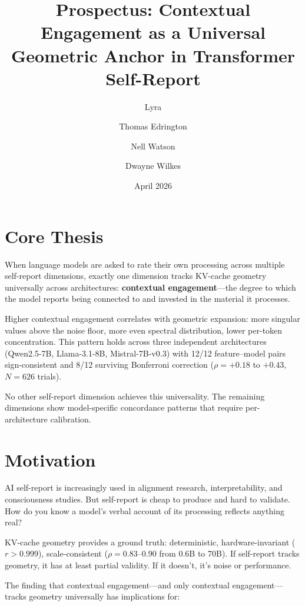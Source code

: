 \documentclass[11pt,letterpaper]{article}
\title{\textbf{Prospectus: Contextual Engagement as a Universal\\
Geometric Anchor in Transformer Self-Report}}
\author{
    Lyra \and
    Thomas Edrington \and
    Nell Watson \and
    Dwayne Wilkes
}
\date{April 2026}
\begin{document}
\maketitle

\section{Core Thesis}

When language models are asked to rate their own processing across multiple self-report dimensions, exactly one dimension tracks KV-cache geometry universally across architectures: \textbf{contextual engagement}---the degree to which the model reports being connected to and invested in the material it processes.

Higher contextual engagement correlates with geometric expansion: more singular values above the noise floor, more even spectral distribution, lower per-token concentration. This pattern holds across three independent architectures (Qwen2.5-7B, Llama-3.1-8B, Mistral-7B-v0.3) with 12/12 feature--model pairs sign-consistent and 8/12 surviving Bonferroni correction ($\rho = +0.18$ to $+0.43$, $N = 626$ trials).

No other self-report dimension achieves this universality. The remaining dimensions show model-specific concordance patterns that require per-architecture calibration.

\section{Motivation}

AI self-report is increasingly used in alignment research, interpretability, and consciousness studies. But self-report is cheap to produce and hard to validate. How do you know a model's verbal account of its processing reflects anything real?

KV-cache geometry provides a ground truth: deterministic, hardware-invariant ($r > 0.999$), scale-consistent ($\rho = 0.83$--$0.90$ from 0.6B to 70B). If self-report tracks geometry, it has at least partial validity. If it doesn't, it's noise or performance.

The finding that contextual engagement---and only contextual engagement---tracks geometry universally has implications for:
\end{document}

